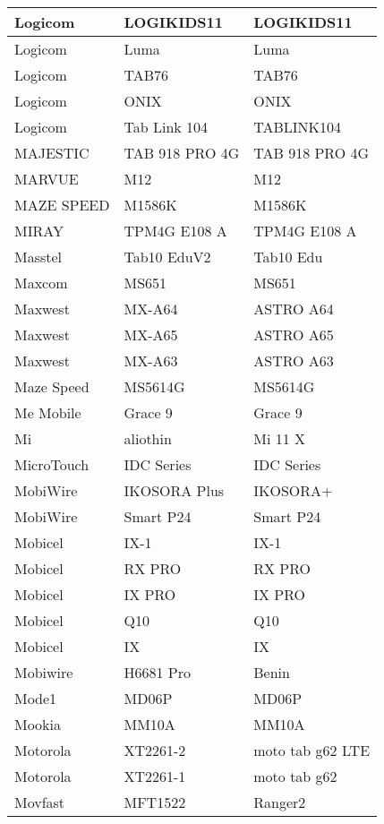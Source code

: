 \begin{tabularx}{\linewidth}{|l|X|X|}
        Logicom & LOGIKIDS11 & LOGIKIDS11 \\ \hline
        Logicom & Luma & Luma \\ \hline
        Logicom & TAB76 & TAB76 \\ \hline
        Logicom & ONIX & ONIX \\ \hline
        Logicom & Tab Link 104 & TABLINK104 \\ \hline
        MAJESTIC & TAB 918 PRO 4G & TAB 918 PRO 4G \\ \hline
        MARVUE & M12 & M12 \\ \hline
        MAZE SPEED & M1586K & M1586K \\ \hline
        MIRAY & TPM4G E108 A & TPM4G E108 A \\ \hline
        Masstel & Tab10 EduV2 & Tab10 Edu \\ \hline
        Maxcom & MS651 & MS651 \\ \hline
        Maxwest & MX-A64 & ASTRO A64 \\ \hline
        Maxwest & MX-A65 & ASTRO A65 \\ \hline
        Maxwest & MX-A63 & ASTRO A63 \\ \hline
        Maze Speed & MS5614G & MS5614G \\ \hline
        Me Mobile & Grace 9 & Grace 9 \\ \hline
        Mi & aliothin & Mi 11 X \\ \hline
        MicroTouch & IDC Series & IDC Series \\ \hline
        MobiWire & IKOSORA Plus & IKOSORA+ \\ \hline
        MobiWire & Smart P24 & Smart P24 \\ \hline
        Mobicel & IX-1 & IX-1 \\ \hline
        Mobicel & RX PRO & RX PRO \\ \hline
        Mobicel & IX PRO & IX PRO \\ \hline
        Mobicel & Q10 & Q10 \\ \hline
        Mobicel & IX & IX \\ \hline
        Mobiwire & H6681 Pro & Benin \\ \hline
        Mode1 & MD06P & MD06P \\ \hline
        Mookia & MM10A & MM10A \\ \hline
        Motorola & XT2261-2 & moto tab g62 LTE \\ \hline
        Motorola & XT2261-1 & moto tab g62 \\ \hline
        Movfast & MFT1522 & Ranger2 \\ \hline

\end{tabularx}
